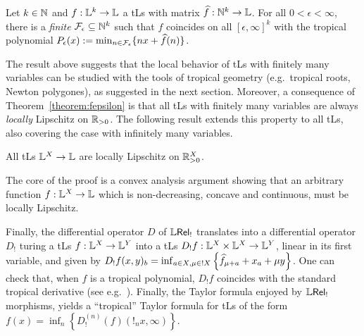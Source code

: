 \documentclass[submission,%
]{eptcs}
\begin{document}
\begin{theorem}\label{theorem:fepsilon}
 Let $k\in\mathbb{N}$ and $f:\mathbb{L}^k\to\mathbb{L}$ a tLs with matrix $\widehat{f}:\mathbb{N}^k\to\mathbb{L}$.
 For all $0<\epsilon<\infty$, there is a \emph{finite} $\mathcal{F}_\epsilon \subseteq \mathbb{N}^k$ such that 
% 
$f$ coincides on all $[\epsilon,\infty]^k$ with the tropical {polynomial} $P_\epsilon(x):=\min_{n\in \mathcal{F}_\epsilon}\{nx+\widehat{f}(n)\}$.
\end{theorem}
The result above suggests that the local behavior of tLs with finitely many variables can be studied with the tools of tropical geometry (e.g.~tropical roots, Newton polygones), as suggested in the next section. 
Moreover, a consequence of Theorem~\ref{theorem:fepsilon} is that all tLs with {finitely many} variables are always \emph{locally} Lipschitz on $\mathbb{R}_{>0}$.
The following result extends this property to all tLs, also covering the case with infinitely many variables.





\begin{theorem}\label{thmTLSlocLip}
 All tLs $\mathbb{L}^X\to\mathbb{L}$ are locally Lipschitz on $\mathbb{R}_{>0}^X$.
\end{theorem}
The core of the proof is a convex analysis argument showing that an arbitrary function $f:\mathbb{L}^X\to\mathbb{L}$ which is non-decreasing, concave and continuous, must be locally Lipschitz. 

Finally, the differential operator $D$ of $\mathbb{L} \mathsf{Rel}_{!}$ translates into a differential operator $D_{!}$ turing a tLs $f:\mathbb{L}^{X}\to \mathbb{L}^{Y}$ into a tLs $D_{!}f:\mathbb{L}^{X}\times \mathbb{L}^{X}\to \mathbb{L}^{Y}$, linear in its first variable, and given by $D_{!}f(x,y)_{b}=\inf_{a\in X, \mu\in !X}\left\{\widehat{f}_{\mu+a}+x_{a}+\mu y\right\}$.
One can check that, when $f$ is a tropical polynomial, $D_{!}f$ coincides with the standard tropical derivative (see e.g.~\cite{Grigoriev2017}).
Finally, the Taylor formula enjoyed by $\mathbb{L} \mathsf{Rel}_!$ morphisms, yields a ``tropical'' Taylor formula for tLs of the form $f(x)=\inf_{n}\left\{D_{!}^{(n)}(f)(!_{n}x,\infty)\right\}$.
\end{document}
